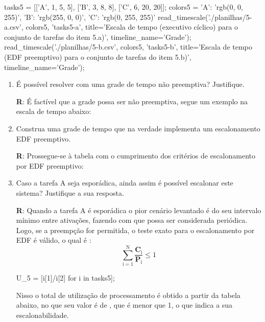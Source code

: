 \documentclass[
	10pt,				%
	openright,			%
	oneside,			%
	a4paper,			%
	english,			%
	french,				%
	spanish,			%
	brazil,				%
	]{abntex2}
\newcommand{\ª}{%
\textordfeminine
}
\begin{document}
\begin{enumerate}
\begin{sagesilent}
tasks5 = [['A', 1, 5, 5], ['B', 3, 8, 8], ['C', 6, 20, 20]];
colors5 = {'A': 'rgb(0, 0, 255)',
                  'B': 'rgb(255, 0, 0)',
                  'C': 'rgb(0, 255, 255)'}
read_timescale('./planilhas/5-a.csv', colors5, 'tasks5-a', title='Escala de tempo (executivo cíclico) para o conjunto de tarefas do item 5.a)', timeline_name='Grade');
read_timescale('./planilhas/5-b.csv', colors5, 'tasks5-b', title='Escala de tempo (EDF preemptivo) para o conjunto de tarefas do item 5.b)', timeline_name='Grade');
\end{sagesilent}

\begin{center}
\end{center}

	\begin{enumerate}[label=\alph*)]
		\item É possível resolver com uma grade de tempo não preemptiva? Justifique.
			
		\textbf{R}: É factível que a grade possa ser não preemptiva, segue um exemplo na escala de tempo abaixo:
		\begin{center}
		\end{center}
		\item Construa uma grade de tempo que na verdade implementa um escalonamento EDF preemptivo.
		
		\textbf{R}: Prossegue-se à tabela com o cumprimento dos critérios de escalonamento por EDF preemptivo:
		\begin{center}
		\end{center}
		\item Caso a tarefa A seja esporádica, ainda assim é possível escalonar este sistema? Justifique a sua
resposta.

		\textbf{R}: Quando a tarefa A é esporádica o pior cenário levantado é do seu intervalo mínimo entre ativações, fazendo com que possa ser considerada periódica. 
		Logo, se a preempção for permitida, o teste exato para o escalonamento por EDF é válido, o qual é \cite[p. 8]{laurent1996}:
		\begin{equation} \label{eq_9}
			\sum_{\mathrm{i} = 1}^{\mathrm{N}}{\frac{\mathbf{C}_{\mathrm{i}}}{\mathbf{P}_{\mathrm{i}}}} \le 1
		\end{equation}
		\begin{sagesilent}
		U_5 = [i[1]/i[2] for i in tasks5];
		\end{sagesilent}
		Nisso o total de utilização de processamento é obtido a partir da tabela abaixo, no que seu valor é de , que é menor que 1, o 
		que indica a sua escalonabilidade.
		\begin{center}
		\end{center}
	\end{enumerate}


\end{enumerate}
\end{document}
